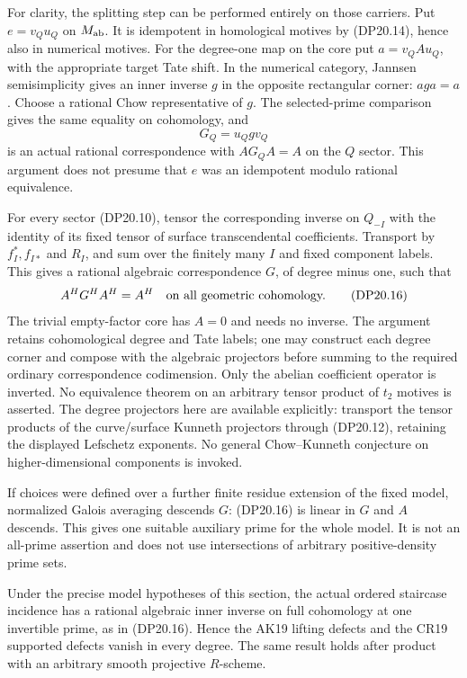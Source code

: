 For clarity, the splitting step can be performed entirely on
those carriers. Put $e=v_Qu_Q$ on $M_{\rm ab}$. It is
idempotent in homological motives by (DP20.14), hence also in
numerical motives. For the degree-one map on the core put
$a=v_Q A u_Q$, with the appropriate target Tate shift.
In the numerical category, Jannsen semisimplicity gives an
inner inverse $g$ in the opposite rectangular corner:
$aga=a$. Choose a rational Chow representative of $g$.
The selected-prime comparison gives the same equality on
cohomology, and
\[
                 G_Q=u_Qg v_Q
 \tag{DP20.15}
\]
is an actual rational correspondence with $AG_QA=A$ on
the $Q$ sector. This argument does not presume that $e$
was an idempotent modulo rational equivalence.

For every sector (DP20.10), tensor the corresponding inverse
on $Q_{-I}$ with the identity of its fixed tensor of surface
transcendental coefficients. Transport by $f_I^*,f_{I*}$ and
$R_I$, and sum over the finitely many $I$ and fixed component
labels. This gives a rational algebraic correspondence $G$,
of degree minus one, such that
\[
                         A^HG^HA^H=A^H
             \quad\hbox{on all geometric cohomology.}
 \tag{DP20.16}
\]
The trivial empty-factor core has $A=0$ and needs no inverse.
The argument retains cohomological degree and Tate labels;
one may construct each degree corner and compose with the
algebraic projectors before summing to the required ordinary
correspondence codimension. Only the abelian coefficient
operator is inverted. No equivalence theorem on an arbitrary
tensor product of $t_2$ motives is asserted.
The degree projectors here are available explicitly: transport
the tensor products of the curve/surface Kunneth projectors
through (DP20.12), retaining the displayed Lefschetz exponents.
No general Chow--Kunneth conjecture on higher-dimensional
components is invoked.

If choices were defined over a further finite residue extension
of the fixed model, normalized Galois averaging descends $G$:
(DP20.16) is linear in $G$ and $A$ descends. This gives one
suitable auxiliary prime for the whole model. It is not an
all-prime assertion and does not use intersections of arbitrary
positive-density prime sets.

\begin{theorem}
\label{r20dp:model}
Under the precise model hypotheses of this section, the actual
ordered staircase incidence has a rational algebraic inner
inverse on full cohomology at one invertible prime, as in
(DP20.16). Hence the AK19 lifting defects and the CR19 supported
defects vanish in every degree. The same result holds after
product with an arbitrary smooth projective $R$-scheme.
\end{theorem}

